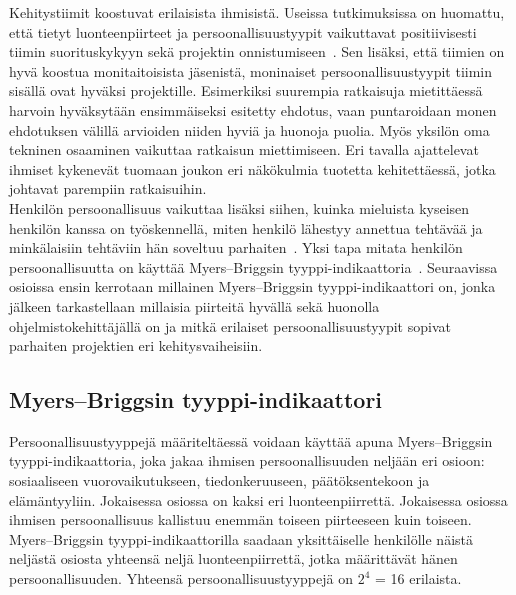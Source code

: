 \documentclass[finnish]{../tktltiki2}
\theoremstyle{definition}
\theoremstyle{remark}
\begin{document}
Kehitystiimit koostuvat erilaisista ihmisistä. Useissa tutkimuksissa on huomattu, että tietyt
luonteenpiirteet ja persoonallisuustyypit vaikuttavat positiivisesti tiimin suorituskykyyn sekä
projektin onnistumiseen~\cite{Acuna:2008:ESP:1414004.1414056,Capretz:2003:PTS:766407.766410,Capretz:2010:MSS:1726559.1726574,Gorla:2004:WWB:990680.990684}. Sen lisäksi, että tiimien on hyvä koostua monitaitoisista
jäsenistä, moninaiset persoonallisuustyypit tiimin sisällä ovat hyväksi
projektille. Esimerkiksi suurempia ratkaisuja mietittäessä harvoin hyväksytään
ensimmäiseksi esitetty ehdotus, vaan puntaroidaan monen ehdotuksen
välillä arvioiden niiden hyviä ja huonoja puolia. Myös yksilön oma
tekninen osaaminen vaikuttaa ratkaisun miettimiseen. Eri tavalla ajattelevat ihmiset kykenevät tuomaan joukon
eri näkökulmia tuotetta kehitettäessä, jotka johtavat parempiin ratkaisuihin.\\

Henkilön persoonallisuus vaikuttaa lisäksi siihen,
kuinka mieluista kyseisen henkilön kanssa on työskennellä,
miten henkilö lähestyy annettua tehtävää ja minkälaisiin tehtäviin
hän soveltuu parhaiten~\cite{Begel:2008:PPW:1414004.1414026,Capretz:2010:MSS:1726559.1726574}. Yksi tapa mitata henkilön persoonallisuutta on käyttää Myers--Briggsin tyyppi-indikaattoria~\cite{Capretz:2003:PTS:766407.766410,Capretz:2010:MSS:1726559.1726574,DaCunha:2007:PMA:1230819.1241672}.
Seuraavissa osioissa ensin kerrotaan millainen Myers--Briggsin tyyppi-indikaattori on, jonka jälkeen tarkastellaan millaisia piirteitä hyvällä sekä huonolla ohjelmistokehittäjällä on ja mitkä erilaiset persoonallisuustyypit sopivat parhaiten projektien eri kehitysvaiheisiin.

\subsection{Myers--Briggsin tyyppi-indikaattori}

Persoonallisuustyyppejä määriteltäessä voidaan käyttää apuna
Myers--Briggsin tyyppi-indikaattoria, joka jakaa ihmisen persoonallisuuden neljään eri osioon: sosiaaliseen vuorovaikutukseen, tiedonkeruuseen, päätöksentekoon ja elämän\-tyyliin. Jokaisessa osiossa on
kaksi eri luonteenpiirrettä. Jokaisessa osiossa ihmisen persoonallisuus kallistuu enemmän toiseen piirteeseen kuin toiseen. Myers--Briggsin
tyyppi-indikaattorilla saadaan yksittäiselle henkilölle näistä neljästä osiosta yhteensä neljä luonteenpiirrettä, jotka määrittävät hänen persoonallisuuden. Yhteensä
persoonallisuustyyppejä on $2^4$ = 16 erilaista.
\end{document}
